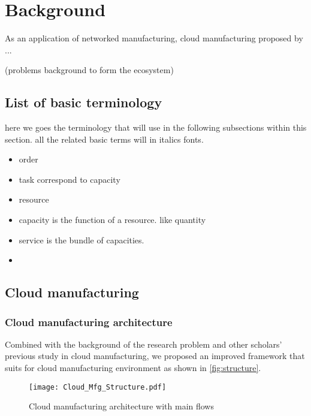 \section{Background} %
\label{sec:background}

As an application of networked manufacturing, cloud manufacturing proposed by ...

(problems background to form the ecosystem)

\subsection{List of basic terminology} %
\label{sub:list_of_basic_terminology}
here we goes the terminology that will use in the following subsections within this section. all the related basic terms will in italics fonts.
\begin{itemize}
	\item order
	\item task correspond to capacity
	\item resource
	\item capacity is the function of a resource. like quantity
	\item service is the bundle of capacities.
	\item 
\end{itemize}

\subsection{Cloud manufacturing} %
\label{sub:cloud_manufacturing}

\subsubsection{Cloud manufacturing architecture}
\label{subs:cloud manufacturing architecture}
Combined with the background of the research problem and other scholars' previous study in cloud manufacturing, we proposed an improved framework that suits for cloud manufacturing environment as shown in \autoref{fig:structure}.
\begin{figure}[htbp]
\centering
\texttt{[image: Cloud\_Mfg\_Structure.pdf]}
\caption{Cloud manufacturing architecture with main flows}
\label{fig:structure}
\end{figure}

